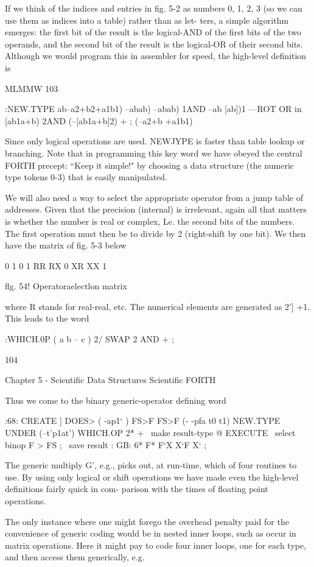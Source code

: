  

If we think of the indices and entries in fig. 5-2 as numbers 0, 1,
2, 3 (so we can use them as indices into a table) rather than as let-
ters, a simple algorithm emerges: the first bit of the result is the
logical-AND of the first bits of the two operands, and the second
bit of the result is the logical-OR of their second bits. Although
we would program this in assembler for speed, the high-level
definition is

MLMMW 103

:NEW.TYPE ab--a2+b2+a1b1)
--abab)
--abab)
1AND --ab [ab])1
—ROT OR in [ab1a+b)
2AND (--[ab1a+b]2)
+ ; (--a2+b +a1b1)

Since only logical operations are used. NEWJYPE is faster than
table lookup or branching. Note that in programming this key
word we have obeyed the central FORTH precept: “Keep it
simple!" by choosing a data structure (the numeric type tokens
0-3) that is easily manipulated.

We will also need a way to select the appropriate operator from
a jump table of addresses. Given that the precision (internal) is
irrelevant, again all that matters is whether the number is real or
complex, Le. the second bits of the numbers. The first operation
must then be to divide by 2 (right-shift by one bit). We then have
the matrix of fig. 5-3 below


0 1 0 1
RR RX 0
XR XX 1

flg. 54! Operatoraelectlon matrix

where R stands for real-real, etc. The numerical elements are
generated as 2'] +1. This leads to the word

    :WHICH.0P ( a b -- c )
    2/ SWAP 2 AND + ;

104

Chapter 5 - Scientific Data Structures Scientific FORTH

Thus we come to the binary generic-operator defining word

    :68: CREATE ] DOES> ( -ap1‘ )
    FS>F FS>F (- -pfa t0 t1)
    NEW.TYPE UNDER (--t’p1at')
    WHICH.OP 2* + \ make result-type
    @ EXECUTE \ select binop
    F > FS ; \ save result
    \say: GB: 6* F* F‘X X‘F X‘ ;

The generic multiply G', e.g., picks out, at run-time, which of
four routines to use. By using only logical or shift operations we
have made even the high-level definitions fairly quick in com-
parison with the times of floating point operations.

The only instance where one might forego the overhead penalty
paid for the convenience of generic coding would be in nested
inner loops, such as occur in matrix operations. Here it might pay
to code four inner loops, one for each type, and then access them
generically, e.g.

